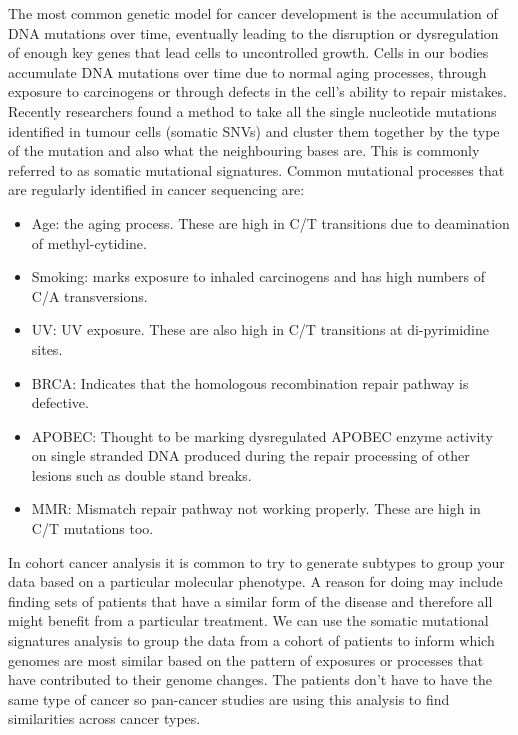 The most common genetic model for cancer development is the accumulation of DNA mutations over time, eventually leading to the disruption or dysregulation of enough key genes that lead cells to uncontrolled growth.
Cells in our bodies accumulate DNA mutations over time due to normal aging processes, through exposure to carcinogens or through defects in the cell's ability to repair mistakes.
Recently researchers found a method to take all the single nucleotide mutations identified in tumour cells (somatic SNVs) and cluster them together by the type of the mutation and also what the neighbouring bases are. This is commonly referred to as somatic mutational signatures.
Common mutational processes that are regularly identified in cancer sequencing are:
\begin{itemize}
\item Age: the aging process. These are high in C/T transitions due to deamination of methyl-cytidine.
\item Smoking: marks exposure to inhaled carcinogens and has high numbers of C/A transversions.
\item UV: UV exposure. These are also high in C/T transitions at di-pyrimidine sites.
\item BRCA: Indicates that the homologous recombination repair pathway is defective.
\item APOBEC: Thought to be marking dysregulated APOBEC enzyme activity on single stranded DNA produced during the repair processing of other lesions such as double stand breaks.
\item MMR: Mismatch repair pathway not working properly. These are high in C/T mutations too.
\end{itemize}
\vspace{4 mm}
In cohort cancer analysis it is common to try to generate subtypes to group your data based on a particular molecular phenotype.
A reason for doing may include finding sets of patients that have a similar form of the disease and therefore all might benefit from a particular treatment.
We can use the somatic mutational signatures analysis to group the data from a cohort of patients to inform which genomes are most similar based on the pattern of exposures or processes that have contributed to their genome changes.
The patients don't have to have the same type of cancer so pan-cancer studies are using this analysis to find similarities across cancer types.



